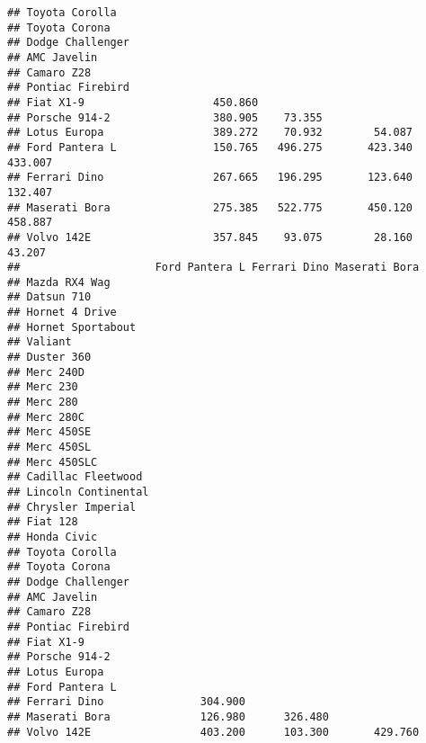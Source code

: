 \documentclass[]{book}
\begin{document}
\begin{verbatim}
## Toyota Corolla                                                           
## Toyota Corona                                                            
## Dodge Challenger                                                         
## AMC Javelin                                                              
## Camaro Z28                                                               
## Pontiac Firebird                                                         
## Fiat X1-9                    450.860                                     
## Porsche 914-2                380.905    73.355                           
## Lotus Europa                 389.272    70.932        54.087             
## Ford Pantera L               150.765   496.275       423.340      433.007
## Ferrari Dino                 267.665   196.295       123.640      132.407
## Maserati Bora                275.385   522.775       450.120      458.887
## Volvo 142E                   357.845    93.075        28.160       43.207
##                     Ford Pantera L Ferrari Dino Maserati Bora
## Mazda RX4 Wag                                                
## Datsun 710                                                   
## Hornet 4 Drive                                               
## Hornet Sportabout                                            
## Valiant                                                      
## Duster 360                                                   
## Merc 240D                                                    
## Merc 230                                                     
## Merc 280                                                     
## Merc 280C                                                    
## Merc 450SE                                                   
## Merc 450SL                                                   
## Merc 450SLC                                                  
## Cadillac Fleetwood                                           
## Lincoln Continental                                          
## Chrysler Imperial                                            
## Fiat 128                                                     
## Honda Civic                                                  
## Toyota Corolla                                               
## Toyota Corona                                                
## Dodge Challenger                                             
## AMC Javelin                                                  
## Camaro Z28                                                   
## Pontiac Firebird                                             
## Fiat X1-9                                                    
## Porsche 914-2                                                
## Lotus Europa                                                 
## Ford Pantera L                                               
## Ferrari Dino               304.900                           
## Maserati Bora              126.980      326.480              
## Volvo 142E                 403.200      103.300       429.760
\end{verbatim}
\end{document}
